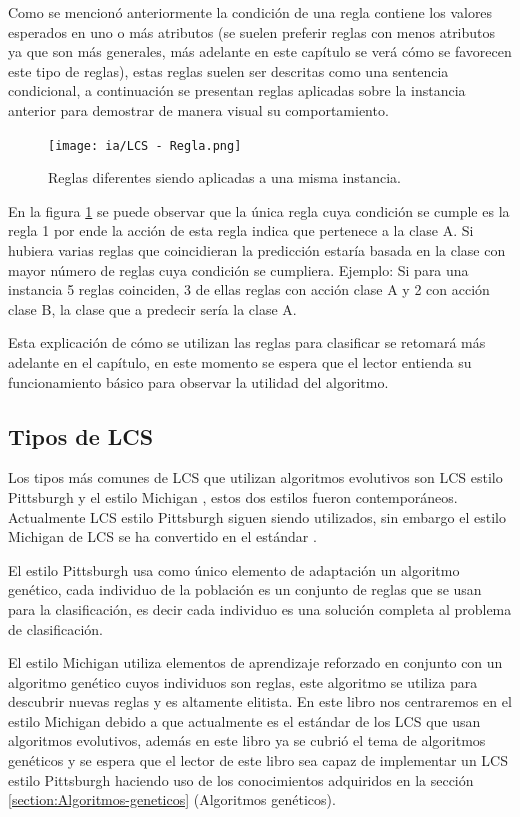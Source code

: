 \documentclass[11pt,fleqn]{book} %
\begin{document}
Como se mencionó anteriormente la condición de una regla contiene los valores esperados en uno o más atributos (se suelen preferir reglas con menos atributos ya que son más generales, más adelante en este capítulo se verá cómo se favorecen este tipo de reglas), estas reglas suelen ser descritas como una sentencia condicional, a continuación se presentan reglas aplicadas sobre la instancia anterior para demostrar de manera visual su comportamiento.

\begin{figure}[ht]
\centering\texttt{[image: ia/LCS - Regla.png]}
\caption{Reglas diferentes siendo aplicadas a una misma instancia.}
\label{fig:LCS-Regla} 
\end{figure}

En la figura \ref{fig:LCS-Regla} se puede observar que la única regla cuya condición se cumple es la regla 1 por ende la acción de esta regla indica que pertenece a la clase A. Si hubiera varias reglas que coincidieran la predicción estaría basada en la clase con mayor número de reglas cuya condición se cumpliera.
Ejemplo: Si para una instancia 5 reglas coinciden, 3 de ellas reglas con acción clase A y 2 con acción clase B, la clase que a predecir sería la clase A.

Esta explicación de cómo se utilizan las reglas para clasificar se retomará más adelante en el capítulo, en este momento se espera que el lector entienda su funcionamiento básico para observar la utilidad del algoritmo.

\FloatBarrier
\subsection{Tipos de LCS} 

Los tipos más comunes de LCS que utilizan algoritmos evolutivos son LCS estilo Pittsburgh \cite{LCS_smith} y el estilo Michigan \cite{HOLLAND1978313}, estos dos estilos fueron contemporáneos. Actualmente LCS estilo Pittsburgh siguen siendo utilizados, sin embargo el estilo Michigan de LCS se ha convertido en el estándar \cite{SOW_LCS_SURVEY}. 

El estilo Pittsburgh usa como único elemento de adaptación un algoritmo genético, cada individuo de la población es un conjunto de reglas que se usan para la clasificación, es decir cada individuo es una solución completa al problema de clasificación.

El estilo Michigan utiliza elementos de aprendizaje reforzado en conjunto con un algoritmo genético cuyos individuos son reglas, este algoritmo se utiliza para descubrir nuevas reglas y es altamente elitista.
En este libro nos centraremos en el estilo Michigan debido a que actualmente es el estándar de los LCS que usan algoritmos evolutivos, además en este libro ya se cubrió el tema de algoritmos genéticos y se espera que el lector de este libro sea capaz de implementar un LCS estilo Pittsburgh haciendo uso de los conocimientos adquiridos en la sección \ref{section:Algoritmos-geneticos} (Algoritmos genéticos).
\end{document}
